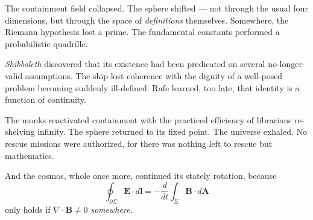 \begin{tcolorbox}[colback=gray!5,colframe=gray!40,boxrule=0.5pt,arc=3pt,boxsep=10pt,left=8pt,right=8pt,top=8pt,bottom=8pt]
The containment field collapsed. The sphere shifted — not through the usual four dimensions, but through the space of \emph{definitions} themselves. Somewhere, the Riemann hypothesis lost a prime. The fundamental constants performed a probabilistic quadrille.

\medskip

\emph{Shibboleth} discovered that its existence had been predicated on several no-longer-valid assumptions. The ship lost coherence with the dignity of a well-posed problem becoming suddenly ill-defined. Rafe learned, too late, that identity is a function of continuity.


\medskip

The monks reactivated containment with the practiced efficiency of librarians re-shelving infinity. The sphere returned to its fixed point. The universe exhaled. No rescue missions were authorized, for there was nothing left to rescue but mathematics.

\medskip

And the cosmos, whole once more, continued its stately rotation, because
\[
\oint_{\partial \Sigma} \mathbf{E} \cdot d\mathbf{l} = -\frac{d}{dt} \int_{\Sigma} \mathbf{B} \cdot d\mathbf{A}
\]
only holds if $\nabla \cdot \mathbf{B} \ne 0$ \emph{somewhere.}

\end{tcolorbox}

\thispagestyle{empty}
\begin{figure}[p]
\centering
{}
\end{figure}